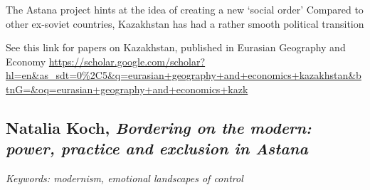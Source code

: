 \documentclass{article}
\begin{document}
\begin{outline}
	\1 The Astana project hints at the idea of creating a new `social order'
	\1 Compared to other ex-soviet countries, Kazakhstan has had a rather smooth political transition
\end{outline}


See this link for papers on Kazakhstan, published in Eurasian Geography and Economy \url{https://scholar.google.com/scholar?hl=en&as_sdt=0%2C5&q=eurasian+geography+and+economics+kazakhstan&btnG=&oq=eurasian+geography+and+economics+kazk} 

\subsection{Natalia Koch, \textit{Bordering on the modern: power, practice and exclusion in Astana}}\cite{koch2014bordering}

\textit{Keywords: modernism, emotional landscapes of control}
\end{document}
